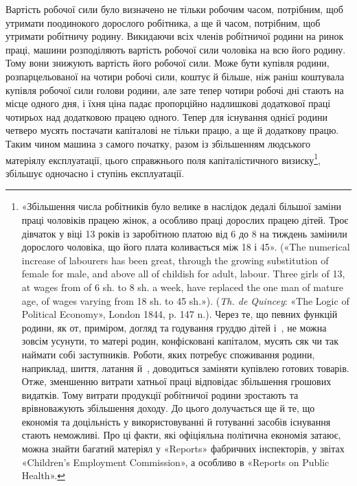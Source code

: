 Вартість робочої сили було визначено не тільки робочим
часом, потрібним, щоб утримати поодинокого дорослого робітника,
а ще й часом, потрібним, щоб утримати робітничу родину.
Викидаючи всіх членів робітничої родини на ринок праці, машини
розподіляють вартість робочої сили чоловіка на всю його родину.
Тому вони знижують вартість його робочої сили. Може бути купівля
родини, розпарцельованої на чотири робочі сили, коштує й
більше, ніж раніш коштувала купівля робочої сили голови родини,
але зате тепер чотири робочі дні стають на місце одного дня, і їхня
ціна падає пропорційно надлишкові додаткової праці чотирьох
над додатковою працею одного. Тепер для існування однієї родини
четверо мусять постачати капіталові не тільки працю, а ще й
додаткову працю. Таким чином машина з самого початку, разом
із збільшенням людського матеріялу експлуатації, цього справжнього
поля капіталістичного визиску\footnote{
«Збільшення числа робітників було велике в наслідок дедалі
більшої заміни праці чоловіків працею жінок, а особливо праці дорослих
працею дітей. Троє дівчаток у віці 13 років із заробітною платою від 6
до 8 на тиждень замінили дорослого чоловіка, що його плата
коливається між 18 і 45». («The numerical increase of labourers
has been great, through the growing substitution of female for male, and
above all of childish for adult, labour. Three girls of 13, at wages from of
6 sh. to 8 sh. a week, have replaced the one man of mature age, of wages
varying from 18 sh. to 45 sh.»). (\emph{Th. de Quincey}: «The Logic of Political
Economy», London 1844, p. 147 n.). Через те, що певних функцій родини,
як от, приміром, догляд та годування груддю дітей і~, не можна зовсім
усунути, то матері родин, конфісковані капіталом, мусять сяк чи так наймати собі заступників. Роботи, яких потребує споживання родини,
наприклад, шиття, латання й~, доводиться заміняти купівлею готових
товарів. Отже, зменшенню витрати хатньої праці відповідає збільшення
грошових видатків. Тому витрати продукції робітничої родини зростають
та врівноважують збільшення доходу. До цього долучається ще й те, що
економія та доцільність у використовуванні й готуванні засобів існування
стають неможливі. Про ці факти, які офіціяльна політична економія
затаює, можна знайти багатий матеріял у «Reports» фабричних інспекторів,
у звітах «Children’s Employment Commission», а особливо в «Reports
on Public Health».
}, збільшує одночасно і ступінь експлуатації.

